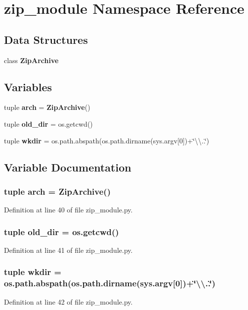 \section{zip\+\_\+module Namespace Reference}
\label{namespacezip__module}
\subsection*{Data Structures}
\begin{DoxyCompactItemize}
\item 
class {\bf Zip\+Archive}
\end{DoxyCompactItemize}
\subsection*{Variables}
\begin{DoxyCompactItemize}
\item 
tuple {\bf arch} = {\bf Zip\+Archive}()
\item 
tuple {\bf old\+\_\+dir} = os.\+getcwd()
\item 
tuple {\bf wkdir} = os.\+path.\+abspath(os.\+path.\+dirname(sys.\+argv[0])+\char`\"{}\textbackslash{}\textbackslash{}..\char`\"{})
\end{DoxyCompactItemize}


\subsection{Variable Documentation}
\subsubsection[{arch}]{\setlength{\rightskip}{0pt plus 5cm}tuple arch = {\bf Zip\+Archive}()}\label{namespacezip__module_ac31b11ea2a121f8efadb6635c3b92f78}


Definition at line 40 of file zip\+\_\+module.\+py.

\subsubsection[{old\+\_\+dir}]{\setlength{\rightskip}{0pt plus 5cm}tuple old\+\_\+dir = os.\+getcwd()}\label{namespacezip__module_af96d0956969a38ccd24ad188c96fc3af}


Definition at line 41 of file zip\+\_\+module.\+py.

\subsubsection[{wkdir}]{\setlength{\rightskip}{0pt plus 5cm}tuple wkdir = os.\+path.\+abspath(os.\+path.\+dirname(sys.\+argv[0])+\char`\"{}\textbackslash{}\textbackslash{}..\char`\"{})}\label{namespacezip__module_a70f2e896502d077d66edf5c7d0bd3477}


Definition at line 42 of file zip\+\_\+module.\+py.

